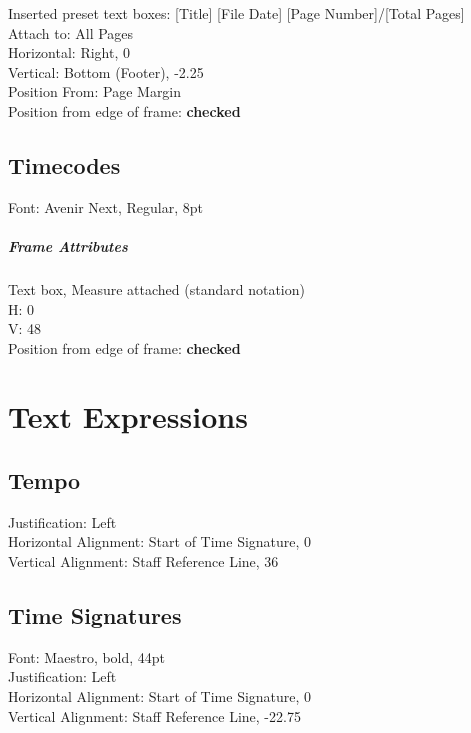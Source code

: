 \documentclass[]{memoir}
\begin{document}
Inserted preset text boxes: [Title] [File Date] [Page Number]/[Total Pages]\\
Attach to: All Pages\\
Horizontal: Right, 0\\
Vertical: Bottom (Footer), -2.25\\
Position From: Page Margin\\
Position from edge of frame: \textbf{checked}

\section{Timecodes}
\label{sec:timecodes}

Font: Avenir Next, Regular, 8pt

\paragraph{Frame Attributes}
\label{sec:frame-attributes-5}

Text box, Measure attached (standard notation)\\
H: 0\\
V: 48\\
Position from edge of frame: \textbf{checked}

\chapter{Text Expressions}
\label{sec:text-expressions}

\section{Tempo}
\label{sec:tempo}

Justification: Left\\
Horizontal Alignment: Start of Time Signature, 0\\
Vertical Alignment: Staff Reference Line, 36

\section{Time Signatures}
\label{sec:time-signatures}

Font: Maestro, bold, 44pt\\
Justification: Left\\
Horizontal Alignment: Start of Time Signature, 0\\
Vertical Alignment: Staff Reference Line, -22.75
\end{document}
